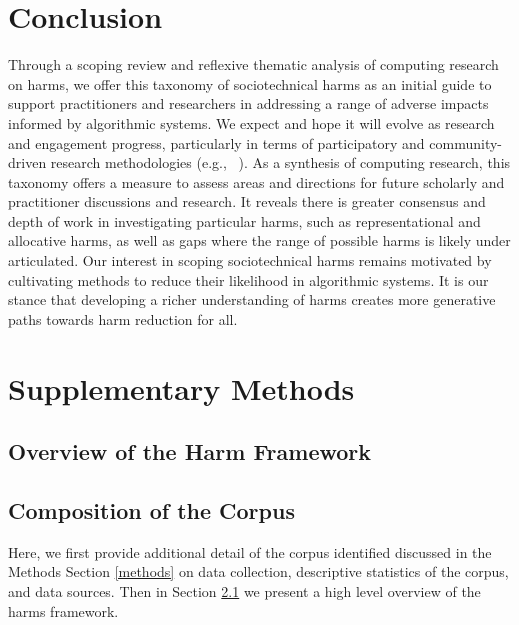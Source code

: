 \section{Conclusion}
\label{conclusion}
Through a scoping review and reflexive thematic analysis of computing research on harms, we offer this taxonomy of sociotechnical harms as an initial guide to support practitioners and researchers in addressing a range of adverse impacts informed by algorithmic systems. We expect and hope it will evolve as research and engagement progress, particularly in terms of participatory and community-driven research methodologies (e.g., ~\cite{DeVos_Dhabalia_Shen_Holstein_Eslami_2022, Dev_Monajatipoor_Ovalle_Subramonian_Phillips_Chang_2021, Friedman_Hurley_Howe_Nissenbaum_Felten_2002}). As a synthesis of computing research, this taxonomy offers a measure to assess areas and directions for future scholarly and practitioner discussions and research. It reveals there is greater consensus and depth of work in investigating particular harms, such as representational and allocative harms, as well as gaps where the range of possible harms is likely under articulated. Our interest in scoping sociotechnical harms remains motivated by cultivating methods to reduce their likelihood in algorithmic systems. It is our stance that developing a richer understanding of harms creates more generative paths towards harm reduction for all. %

\newpage
\onecolumn
\section{Supplementary Methods}
\label{sec:supplementary_methods}

\subsection{Overview of the Harm Framework}
\label{harmframework}


\subsection{Composition of the Corpus}
Here, we first provide additional detail of the corpus identified discussed in the Methods Section \ref{methods} on data collection, descriptive statistics of the corpus, and data sources. Then in Section \ref{harmframework} we present a high level overview of the harms framework.

